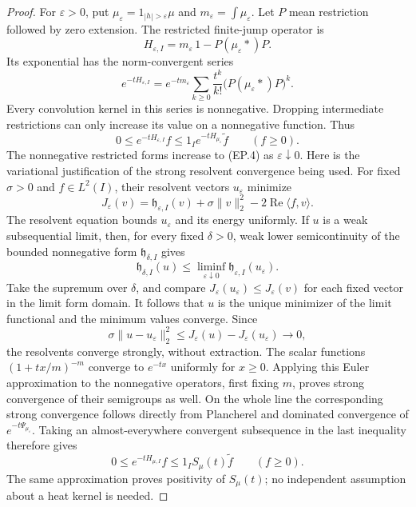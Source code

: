 \begin{proof}
For \(\varepsilon>0\), put
\(\mu_\varepsilon=1_{|h|>\varepsilon}\mu\) and
\(m_\varepsilon=\int\mu_\varepsilon\).
Let \(P\) mean restriction followed by zero extension.
The restricted finite-jump operator is
\[
 H_{\varepsilon,I}
       =m_\varepsilon\,1-P(\mu_\varepsilon*)P.
\]
Its exponential has the norm-convergent series
\[
 e^{-tH_{\varepsilon,I}}
   =e^{-tm_\varepsilon}
        \sum_{k\geq0}\frac{t^k}{k!}
                    \bigl(P(\mu_\varepsilon*)P\bigr)^k.
\]
Every convolution kernel in this series is nonnegative.
Dropping intermediate restrictions can only increase
its value on a nonnegative function.  Thus
\[
 0\leq e^{-tH_{\varepsilon,I}}f
           \leq 1_I e^{-tH_{\mu_\varepsilon}}\widetilde f
                    \qquad(f\geq0).
\]
The nonnegative restricted forms increase to (EP.4)
as \(\varepsilon\downarrow0\).  Here is the variational
justification of the strong resolvent convergence being
used.  For fixed \(\sigma>0\) and \(f\in L^2(I)\), their
resolvent vectors \(u_\varepsilon\) minimize
\[
 J_\varepsilon(v)=\mathfrak h_{\varepsilon,I}(v)
              +\sigma\|v\|_2^2-2\operatorname{Re}\langle f,v\rangle .
\]
The resolvent equation bounds \(u_\varepsilon\) and its
energy uniformly.  If \(u\) is a weak subsequential limit,
then, for every fixed \(\delta>0\), weak lower
semicontinuity of the bounded nonnegative form
\(\mathfrak h_{\delta,I}\) gives
\[
 \mathfrak h_{\delta,I}(u)
        \leq\liminf_{\varepsilon\downarrow0}
                        \mathfrak h_{\varepsilon,I}(u_\varepsilon).
\]
Take the supremum over \(\delta\), and compare
\(J_\varepsilon(u_\varepsilon)\leq J_\varepsilon(v)\)
for each fixed vector in the limit form domain.
It follows that \(u\) is the unique minimizer of the
limit functional and the minimum values converge.
Since
\[
 \sigma\|u-u_\varepsilon\|_2^2
       \leq J_\varepsilon(u)-J_\varepsilon(u_\varepsilon)
                    \longrightarrow0,
\]
the resolvents converge strongly, without extraction.
The scalar functions \((1+tx/m)^{-m}\) converge to
\(e^{-tx}\) uniformly for \(x\geq0\).
Applying this Euler approximation to the nonnegative
operators, first fixing \(m\), proves strong convergence
of their semigroups as well.
On the whole line the corresponding
strong convergence follows directly from Plancherel and
dominated convergence of \(e^{-t\Psi_{\mu_\varepsilon}}\).
Taking an almost-everywhere convergent subsequence in the
last inequality therefore gives
\[
 0\leq e^{-tH_{\mu,I}}f
             \leq1_I S_\mu(t)\widetilde f
                    \qquad(f\geq0).                   \tag{EP.10}
\]
The same approximation proves positivity of \(S_\mu(t)\);
no independent assumption about a heat kernel is needed.


\end{proof}
